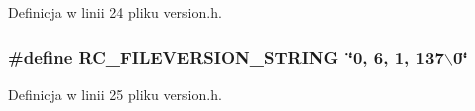 Definicja w linii 24 pliku version.h.\hypertarget{a00017_4763e81d3c29ec0fab79225d3ec3f1a2}{
\subsubsection[{RC\_\-FILEVERSION\_\-STRING}]{\setlength{\rightskip}{0pt plus 5cm}\#define RC\_\-FILEVERSION\_\-STRING~\char`\"{}0, 6, 1, 137$\backslash$0\char`\"{}}}
\label{d4/d51/a00017_4763e81d3c29ec0fab79225d3ec3f1a2}




Definicja w linii 25 pliku version.h.